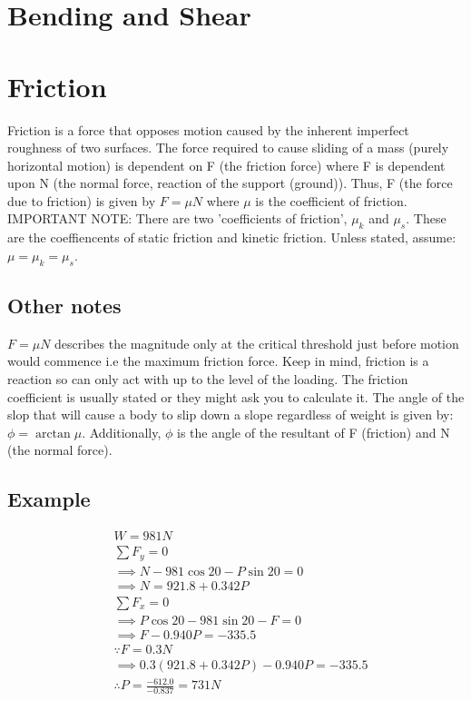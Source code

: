 \documentclass[a4paper, 12pt]{article}
\begin{document}
\section{Bending and Shear}

\section{Friction} 
Friction is a force that opposes motion caused by the inherent imperfect roughness of two surfaces. 
The force required to cause sliding of a mass (purely horizontal motion) is dependent on F (the friction force)
where F is dependent upon N (the normal force, reaction of the support (ground)). Thus, F (the force due to friction) 
is given by $F=\mu N$ where $\mu$ is the coefficient of friction. IMPORTANT NOTE: There are two 'coefficients of friction', $\mu_k$ and $\mu_s$.
These are the coeffiencents of static friction and kinetic friction. Unless stated, assume: $\mu = \mu_k = \mu_s$.

\subsection{Other notes}
$F = \mu N$ describes the magnitude only at the critical threshold just before motion 
would commence i.e the maximum friction force. Keep in mind, friction is a reaction so can only act with up to the level of the loading. 
The friction coefficient is usually stated or they might ask you to calculate it. The angle of the slop that will cause a body to slip down
a slope regardless of weight is given by: $\phi = \arctan{\mu}$. Additionally, $\phi$ is the angle of the resultant of F (friction) and N (the normal force). 

\subsection{Example}
\begin{align*}
    &W = 981N \\
    &\sum F_y = 0 \\
    &\implies N - 981\cos{20} - P\sin{20} = 0 \\
    &\implies N = 921.8 + 0.342P \\
    &\sum F_x = 0 \\
    &\implies P\cos{20} - 981\sin{20} - F = 0 \\
    &\implies F - 0.940P = -335.5 \\
    &\because F = 0.3N \\
    &\implies 0.3(921.8 + 0.342P) - 0.940P = -335.5 \\
    &\therefore P = \frac{-612.0}{-0.837} = 731N \\
\end{align*}
\end{document}
